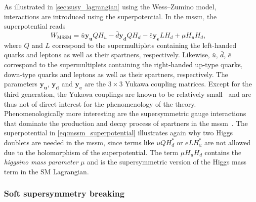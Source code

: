 As illustrated in \cref{sec:susy_lagrangian} using the Wess--Zumino model, interactions are introduced using the superpotential. In the \gls{mssm}, the superpotential reads
\begin{equation}
	W_\mathrm{MSSM} = \bar{u}\boldsymbol{y_u}QH_u - \bar{d}\boldsymbol{y_d}QH_d - \bar{e}\boldsymbol{y_e}LH_d + \mu H_uH_d,
	\label{eq:mssm_superpotential}
\end{equation}
where $Q$ and $L$ correspond to the supermultiplets containing the left-handed quarks and leptons as well as their spartners, respectively. Likewise, $\bar{u}$, $\bar{d}$, $\bar{e}$ correspond to the supermultiplets containing the right-handed up-type quarks, down-type quarks and leptons as well as their spartners, respectively. The parameters $\boldsymbol{y_u}$, $\boldsymbol{y_d}$ and $\boldsymbol{y_e}$ are the $3\times 3$ Yukawa coupling matrices. Except for the third generation, the Yukawa couplings are known to be relatively small~\cite{Martin:1997ns} and are thus not of direct interest for the phenomenology of the theory. Phenomenologically more interesting are the supersymmetric gauge interactions that dominate the production and decay process of spartners in the \gls{mssm}~\cite{Martin:1997ns}. The superpotential in \cref{eq:mssm_superpotential} illustrates again why two Higgs doublets are needed in the \gls{mssm}, since terms like $\bar{u}QH_d^*$ or $\bar{e}LH_u^*$ are not allowed due to the holomorphism of the superpotential. The term $\mu H_u H_d$ contains the \textit{higgsino mass parameter} $\mu$ and is the supersymmetric version of the Higgs mass term in the SM Lagrangian.


\subsubsection{Soft supersymmetry breaking}\label{sec:susy_breaking}

